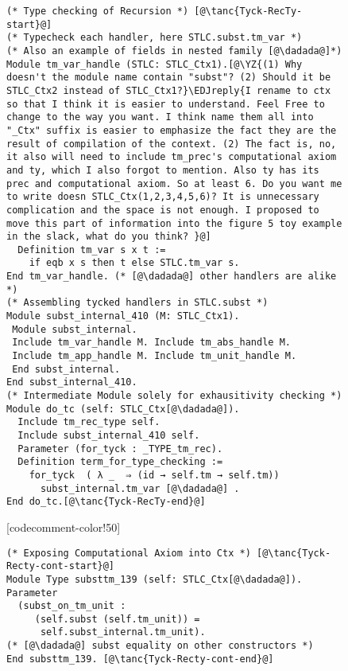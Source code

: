 \begin{figure}
\begin{minipage}{\textwidth}
\begin{multicols}{2}
\begin{lstlisting}
(* Type checking of Recursion *) [@\tanc{Tyck-RecTy-start}@]
(* Typecheck each handler, here STLC.subst.tm_var *)
(* Also an example of fields in nested family [@\dadada@]*) 
Module tm_var_handle (STLC: STLC_Ctx1).[@\YZ{(1) Why doesn't the module name contain "subst"? (2) Should it be STLC_Ctx2 instead of STLC_Ctx1?}\EDJreply{I rename to ctx so that I think it is easier to understand. Feel Free to change to the way you want. I think name them all into "_Ctx" suffix is easier to emphasize the fact they are the result of compilation of the context. (2) The fact is, no, it also will need to include tm_prec's computational axiom and ty, which I also forgot to mention. Also ty has its prec and computational axiom. So at least 6. Do you want me to write doesn STLC_Ctx(1,2,3,4,5,6)? It is unnecessary complication and the space is not enough. I proposed to move this part of information into the figure 5 toy example in the slack, what do you think? }@]
  Definition tm_var s x t := 
    if eqb x s then t else STLC.tm_var s.
End tm_var_handle. (* [@\dadada@] other handlers are alike *)
(* Assembling tycked handlers in STLC.subst *)
Module subst_internal_410 (M: STLC_Ctx1). 
 Module subst_internal.
 Include tm_var_handle M. Include tm_abs_handle M.
 Include tm_app_handle M. Include tm_unit_handle M.
 End subst_internal.
End subst_internal_410.
(* Intermediate Module solely for exhausitivity checking *) 
Module do_tc (self: STLC_Ctx[@\dadada@]).
  Include tm_rec_type self. 
  Include subst_internal_410 self.
  Parameter (for_tyck : _TYPE_tm_rec).
  Definition term_for_type_checking :=
    for_tyck  ( λ _  ⇒ (id → self.tm → self.tm))
      subst_internal.tm_var [@\dadada@] .
End do_tc.[@\tanc{Tyck-RecTy-end}@]
\end{lstlisting}

[codecomment-color!50]

\columnbreak



\begin{lstlisting}
(* Exposing Computational Axiom into Ctx *) [@\tanc{Tyck-Recty-cont-start}@]
Module Type substtm_139 (self: STLC_Ctx[@\dadada@]).
Parameter
  (subst_on_tm_unit :
	 (self.subst (self.tm_unit)) =
      self.subst_internal.tm_unit).
(* [@\dadada@] subst equality on other constructors *)
End substtm_139. [@\tanc{Tyck-Recty-cont-end}@]
\end{lstlisting}




\end{multicols}
\end{minipage}
\end{figure}
